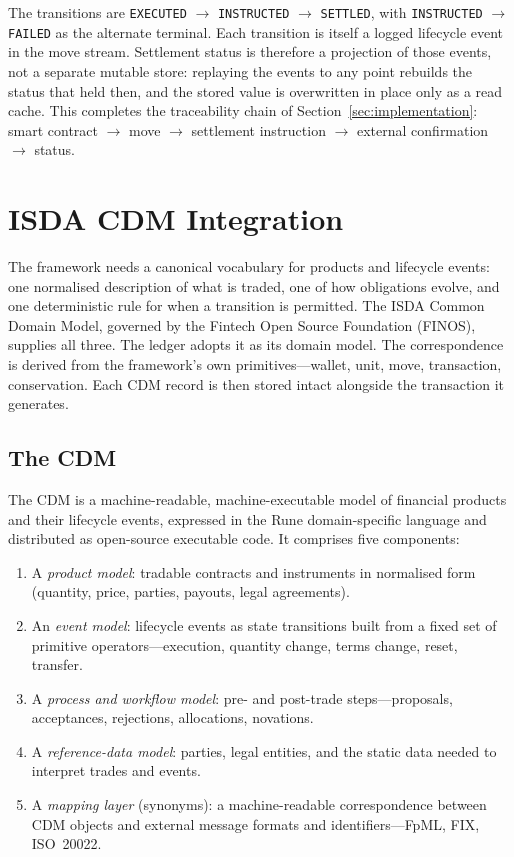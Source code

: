 \documentclass[11pt,a4paper]{article}
\begin{document}
\noindent The transitions are \texttt{EXECUTED} $\to$ \texttt{INSTRUCTED} $\to$ \texttt{SETTLED}, with \texttt{INSTRUCTED} $\to$ \texttt{FAILED} as the alternate terminal. Each transition is itself a logged lifecycle event in the move stream. Settlement status is therefore a projection of those events, not a separate mutable store: replaying the events to any point rebuilds the status that held then, and the stored value is overwritten in place only as a read cache. This completes the traceability chain of Section~\ref{sec:implementation}: smart contract $\to$ move $\to$ settlement instruction $\to$ external confirmation $\to$ status.


\section{ISDA CDM Integration}
\label{sec:cdm}

The framework needs a canonical vocabulary for products and lifecycle events: one normalised description of what is traded, one of how obligations evolve, and one deterministic rule for when a transition is permitted. The ISDA Common Domain Model, governed by the Fintech Open Source Foundation (FINOS), supplies all three. The ledger adopts it as its domain model. The correspondence is derived from the framework's own primitives---wallet, unit, move, transaction, conservation. Each CDM record is then stored intact alongside the transaction it generates.

\subsection{The CDM}

The CDM is a machine-readable, machine-executable model of financial products and their lifecycle events, expressed in the Rune domain-specific language and distributed as open-source executable code. It comprises five components:

\begin{enumerate}[nosep]
\item A \textit{product model}: tradable contracts and instruments in normalised form (quantity, price, parties, payouts, legal agreements).
\item An \textit{event model}: lifecycle events as state transitions built from a fixed set of primitive operators---execution, quantity change, terms change, reset, transfer.
\item A \textit{process and workflow model}: pre- and post-trade steps---proposals, acceptances, rejections, allocations, novations.
\item A \textit{reference-data model}: parties, legal entities, and the static data needed to interpret trades and events.
\item A \textit{mapping layer} (synonyms): a machine-readable correspondence between CDM objects and external message formats and identifiers---FpML, FIX, ISO~20022.
\end{enumerate}
\end{document}
